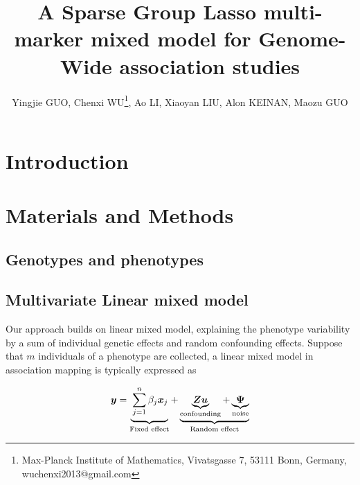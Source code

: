 \documentclass[11pt]{article}
\theoremstyle{plain}
\theoremstyle{definition}
\theoremstyle{remark}
\begin{document}
\title{A Sparse Group Lasso multi-marker mixed model for Genome-Wide association studies}


\author{Yingjie GUO, Chenxi WU\footnote{Max-Planck Institute of Mathematics, Vivatsgasse 7, 53111 Bonn, Germany, wuchenxi2013@gmail.com}, Ao LI, Xiaoyan LIU, Alon KEINAN, Maozu GUO}

\maketitle


\begin{abstract}



\end{abstract}

\section{Introduction}




\section{Materials and Methods}

\subsection{Genotypes and phenotypes}

\subsection{}

\subsection{Multivariate Linear mixed model}
Our approach builds on linear mixed model, explaining the phenotype variability by a sum of individual genetic effects and random confounding effects. Suppose that $m$ individuals of a phenotype are collected, a linear mixed model in association mapping is typically expressed as

\begin{equation}
\label{eq:1}
\bm{y} = \underbrace{\vphantom{\underbrace{\bm{Zu}}_\text{confounding}}\sum_{j=1}^n\beta_j\boldsymbol x_j}_\text{Fixed effect} + \underbrace{\underbrace{\bm{Zu}}_\text{confounding} + \underbrace{\bm{\Psi}}_\text{noise}}_\text{Random effect}
\end{equation}
\end{document}

